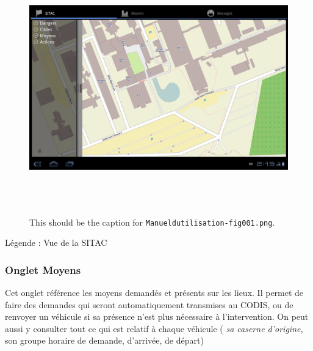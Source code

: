 \documentclass{article}
\begin{document}
\begin{figure}[htbp]
\begin{center}
\includegraphics[width=487pt, height=309pt]{Manueldutilisation-fig001.png}
\caption{This should be the caption for \texttt{Manueldutilisation-fig001.png}.}
\end{center}
\end{figure}

\vspace{27pt}
\begin{center}
{\color{color01} Légende : Vue de la SITAC\label{h.2icx4wemxfdj}}
\end{center}

\vspace{41pt}
\subsubsection*{{\color{color02} \textbf{Onglet Moyens}}}

{\color{color01} Cet onglet référence les moyens demandés et présents sur les 
lieux. Il permet de faire des demandes qui seront automatiquement transmises au 
CODIS, ou de renvoyer un véhicule si sa présence n'est plus nécessaire à l'intervention. 
On peut aussi y consulter tout ce qui est relatif à chaque véhicule (}{\color{color01} \textit{sa 
caserne d'origine,}}{\color{color01}  son groupe horaire de demande, d'arrivée, 
de départ)}
\end{document}
